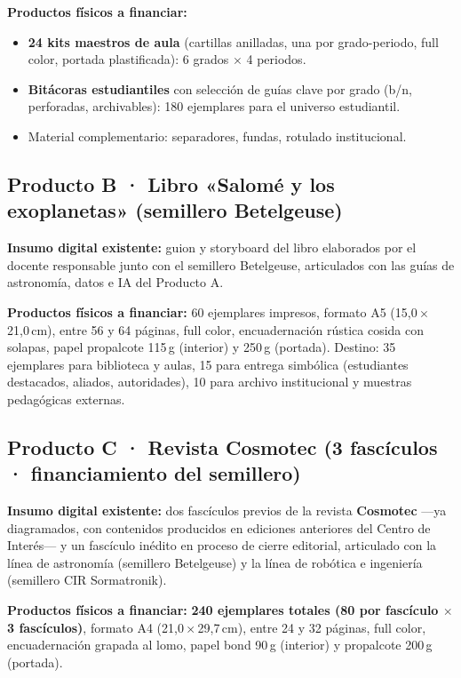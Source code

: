 \documentclass[12pt, letterpaper]{article}
\begin{document}
\textbf{Productos físicos a financiar:}
\begin{itemize}[leftmargin=*]
  \item \textbf{24 kits maestros de aula} (cartillas anilladas, una por grado-periodo, full color, portada plastificada): 6 grados $\times$ 4 periodos.
  \item \textbf{Bitácoras estudiantiles} con selección de guías clave por grado (b/n, perforadas, archivables): 180 ejemplares para el universo estudiantil.
  \item Material complementario: separadores, fundas, rotulado institucional.
\end{itemize}

\subsection{Producto B · Libro «Salomé y los exoplanetas» (semillero Betelgeuse)}

\textbf{Insumo digital existente:} guion y storyboard del libro elaborados por el docente responsable junto con el semillero Betelgeuse, articulados con las guías de astronomía, datos e IA del Producto A.

\textbf{Productos físicos a financiar:} 60 ejemplares impresos, formato A5 (15{,}0\,\(\times\)\,21{,}0\,cm), entre 56 y 64 páginas, full color, encuadernación rústica cosida con solapas, papel propalcote 115\,g (interior) y 250\,g (portada). Destino: 35 ejemplares para biblioteca y aulas, 15 para entrega simbólica (estudiantes destacados, aliados, autoridades), 10 para archivo institucional y muestras pedagógicas externas.

\subsection{Producto C · Revista \textbf{Cosmotec} (3 fascículos · financiamiento del semillero)}

\textbf{Insumo digital existente:} dos fascículos previos de la revista \textbf{Cosmotec} —ya diagramados, con contenidos producidos en ediciones anteriores del Centro de Interés— y un fascículo inédito en proceso de cierre editorial, articulado con la línea de astronomía (semillero Betelgeuse) y la línea de robótica e ingeniería (semillero CIR Sormatronik).

\textbf{Productos físicos a financiar:} \textbf{240 ejemplares totales (80 por fascículo $\times$ 3 fascículos)}, formato A4 (21{,}0\,\(\times\)\,29{,}7\,cm), entre 24 y 32 páginas, full color, encuadernación grapada al lomo, papel bond 90\,g (interior) y propalcote 200\,g (portada).
\end{document}
